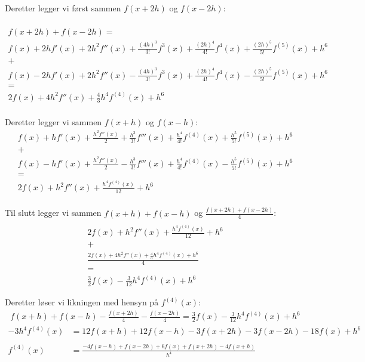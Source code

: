 Deretter legger vi først sammen $f(x+2h)$ og $f(x-2h)$: 

\begin{multline}
    \\
    f(x+2h)+f(x-2h)= \\
    f(x)+2hf'(x)+2h^2f''(x)+\frac{(4h)^3}{3!}f^3(x)+\frac{(2h)^4}{4!}f^{4}(x)+\frac{(2h)^5}{5!}f^{(5)}(x)+h^6 \\
    + \\
  	f(x)-2hf'(x)+2h^2f''(x)-\frac{(4h)^3}{3!}f^3(x)+\frac{(2h)^4}{4!}f^{4}(x)-\frac{(2h)^5}{5!}f^{(5)}(x)+h^6\nonumber \\
  	=\\
  	2f(x)+4h^2f''(x)+\frac{4}{3}h^4f^{(4)}(x)+h^6 \nonumber\\
\end{multline}

Deretter legger vi sammen $f(x+h)$ og $f(x-h)$: 
\begin{multline}
	f(x)+hf'(x)+\frac{h^2f''(x)}{2}+\frac{h^3}{3!}f'''(x)+\frac{h^4}{4!}f^{(4)}(x)+\frac{h^5}{5!}f^{(5)}(x)+h^6\\
	+\\
	f(x)-hf'(x)+\frac{h^2f''(x)}{2}-\frac{h^3}{3!}f'''(x)+\frac{h^4}{4!}f^{(4)}(x)-\frac{h^5}{5!}f^{(5)}(x)+h^6\\
	=\\
	2f(x)+h^2f''(x)+\frac{h^4f^{(4)}(x)}{12} + h^6 \nonumber \\
\end{multline}

Til slutt legger vi sammen $f(x+h)+f(x-h)$ og $\frac{f(x+2h)+f(x-2h)}{4}$: 
\begin{multline}
	\\
	2f(x)+h^2f''(x)+\frac{h^4f^{(4)}(x)}{12} + h^6 \\
	+\\
	\frac{2f(x)+4h^2f''(x)+\frac{4}{3}h^4f^{(4)}(x)+h^6 }{4}\\
	=\\
	\frac{3}{2}f(x)-\frac{3}{12}h^4f^{(4)}(x)+h^6
\end{multline}

Deretter løser vi likningen med hensyn på $f^{(4)}(x)$: 
\begin{align}
    f(x+h)+f(x-h)-\frac{f(x+2h)}{4}-\frac{f(x-2h)}{4}=\frac{3}{2}f(x)-\frac{3}{12}h^4f^{(4)}(x)+h^6\nonumber
\end{align}
\begin{align}
     -3h^4f^{(4)}(x)&=12f(x+h)+12f(x-h)-3f(x+2h)-3f(x-2h)-18f(x) +h^6 \nonumber \\
     \nonumber \\
	f^{(4)}(x)&=\frac{-4f(x-h)+f(x-2h)+6f(x)+f(x+2h)-4f(x+h)}{h^4}
\end{align}


